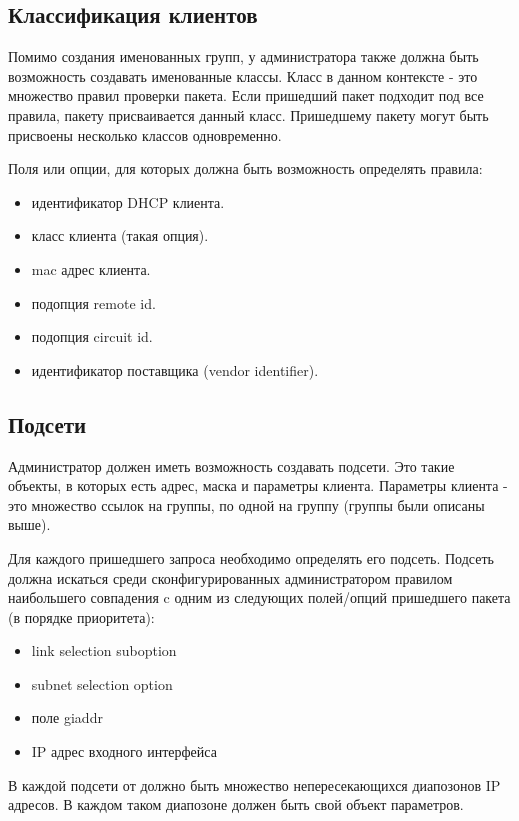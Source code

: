 \documentclass[14pt,a4paper]{extarticle}
\begin{document}
\subsection{Классификация клиентов}

Помимо создания именованных групп, у администратора также должна быть возможность создавать именованные классы.
Класс в данном контексте - это множество правил проверки пакета.
Если пришедший пакет подходит под все правила, пакету присваивается данный класс.
Пришедшему пакету могут быть присвоены несколько классов одновременно.

Поля или опции, для которых должна быть возможность определять правила:

\begin{itemize}
    \item идентификатор DHCP клиента.
    \item класс клиента (такая опция).
    \item mac адрес клиента.
    \item подопция remote id.
    \item подопция circuit id.
    \item идентификатор поставщика (vendor identifier).
\end{itemize}


\subsection{Подсети}

Администратор должен иметь возможность создавать подсети.
Это такие объекты, в которых есть адрес, маска и параметры клиента.
Параметры клиента - это множество ссылок на группы, по одной на группу (группы были описаны выше).

Для каждого пришедшего запроса необходимо определять его подсеть.
Подсеть должна искаться среди сконфигурированных администратором правилом наибольшего совпадения c одним из следующих полей/опций пришедшего пакета (в порядке приоритета):

\begin{itemize}
    \item link selection suboption \cite{rfc3527}
    \item subnet selection option \cite{rfc3011}
    \item поле giaddr
    \item IP адрес входного интерфейса
\end{itemize}

В каждой подсети от должно быть множество непересекающихся диапозонов IP адресов. В каждом таком диапозоне должен быть свой объект параметров.
\end{document}

